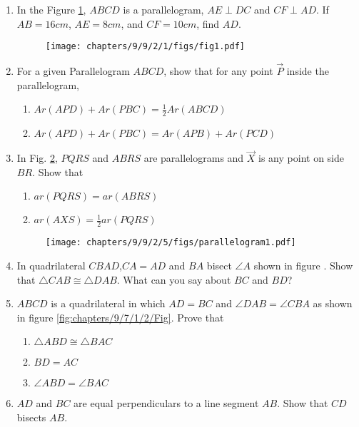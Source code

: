 \begin{enumerate}[label=\thesection.\arabic*,ref=\thesection.\theenumi]
\item In the Figure \ref{fig:9/9/2/1}, $ABCD$ is a parallelogram, $AE \perp DC$ and $CF \perp AD$. If $AB = 16 cm$, $AE = 8 cm$, and $CF = 10cm$, find $AD$.
	\begin{figure}[!h]
		\centering
 \texttt{[image: chapters/9/9/2/1/figs/fig1.pdf]}
		\caption{}
		\label{fig:9/9/2/1}
  	\end{figure}

\item For a given Parallelogram $ABCD$, show that for any
point $\vec{P}$ inside the parallelogram,
\begin{enumerate}
	\item $Ar(APD)+Ar(PBC) = \frac{1}{2}Ar(ABCD)$
	\item $Ar(APD)+Ar(PBC) = Ar(APB)+Ar(PCD)$
\end{enumerate}

\item In Fig.
		\ref{fig:9/9/2/5},
$PQRS$ and $ABRS$ are parallelograms
and $\vec{X}$ is any point on side $BR$. Show that  
\begin{enumerate}
    \item $ar (PQRS) = ar(ABRS)$
	    \label{prop:9/9/2/5}
    \item $ar(AXS) = \frac{1}{2} ar(PQRS)$
\end{enumerate}
	\begin{figure}[!h]
		\centering
 \texttt{[image: chapters/9/9/2/5/figs/parallelogram1.pdf]}
		\caption{}
		\label{fig:9/9/2/5}
  	\end{figure}

%	
\item In quadrilateral $CBAD$,$CA = AD$ and $BA$ bisect $\angle{A}$ shown in figure . Show that $\triangle{CAB} \cong \triangle{DAB}$. What can you say about $BC$ and $BD$? \\
	\solution

\item $ABCD$ is a quadrilateral in which $AD = BC$ and $\angle{DAB} = \angle{CBA}$ as shown in figure \ref{fig:chapters/9/7/1/2/Fig}. Prove that
\begin{enumerate}
\item $\triangle{ABD} \cong \triangle{BAC}$
  \item $BD = AC$
  \item $\angle{ABD} = \angle{BAC}$
\end{enumerate}
	\solution

\item $AD$ and $BC$ are equal perpendiculars to a line segment $AB$. Show that $CD$ bisects $AB$.\\
	\solution


\end{enumerate}
